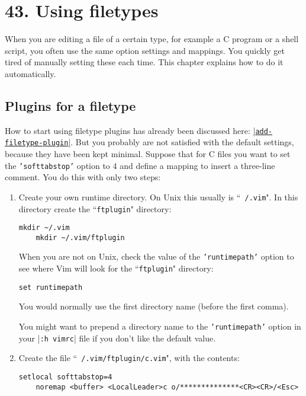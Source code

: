 \section{43. Using filetypes}
When you are editing a file of a certain type, for example a C program or a shell script, you often use the same option settings and mappings.
You quickly get tired of manually setting these each time.
This chapter explains how to do it automatically.
\localtableofcontents
\subsection{Plugins for a filetype}
\label{filetype-plugin}
How to start using filetype plugins has already been discussed here: \hyperref[add-filetype-plugin]{|\texttt{add-filetype-plugin}|}.
But you probably are not satisfied with the default settings, because they have been kept minimal.
Suppose that for C files you want to set the \texttt{'softtabstop'} option to 4 and define a mapping to insert a three-line comment.
You do this with only two steps:

\label{your-runtime-dir}
\begin{enumerate}
				\item Create your own runtime directory.
								On Unix this usually is ``\texttt{~/.vim}".
								In this directory create the ``\texttt{ftplugin}" directory:

								\begin{Verbatim}[samepage=true]
	mkdir ~/.vim
	mkdir ~/.vim/ftplugin
								\end{Verbatim}


								When you are not on Unix, check the value of the \texttt{'runtimepath'} option to see where Vim will look for the ``\texttt{ftplugin}" directory:

								\begin{Verbatim}[samepage=true]
 set runtimepath
								\end{Verbatim}

								You would normally use the first directory name (before the first comma).

								You might want to prepend a directory name to the \texttt{'runtimepath'} option in your |\texttt{:h vimrc}| file if you don't like the default value.

				\item Create the file ``\texttt{~/.vim/ftplugin/c.vim}", with the contents:
								\begin{Verbatim}[samepage=true]
	setlocal softtabstop=4
	noremap <buffer> <LocalLeader>c o/**************<CR><CR>/<Esc>
								\end{Verbatim}
\end{enumerate}

